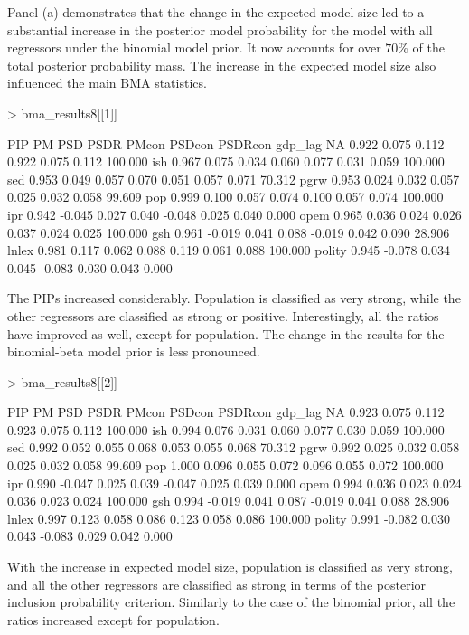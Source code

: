 \documentclass[a4paper]{article}
\begin{document}
Panel (a) demonstrates that the change in the expected model size led to a substantial increase in the posterior model probability for the model with all regressors under the binomial model prior.
It now accounts for over $70\%$ of the total posterior probability mass.
The increase in the expected model size also influenced the main BMA statistics.
\begin{Schunk}
\begin{Sinput}
> bma_results8[[1]]
\end{Sinput}
\begin{Soutput}
          PIP     PM   PSD  PSDR  PMcon PSDcon PSDRcon    %
gdp_lag    NA  0.922 0.075 0.112  0.922  0.075   0.112 100.000
ish     0.967  0.075 0.034 0.060  0.077  0.031   0.059 100.000
sed     0.953  0.049 0.057 0.070  0.051  0.057   0.071  70.312
pgrw    0.953  0.024 0.032 0.057  0.025  0.032   0.058  99.609
pop     0.999  0.100 0.057 0.074  0.100  0.057   0.074 100.000
ipr     0.942 -0.045 0.027 0.040 -0.048  0.025   0.040   0.000
opem    0.965  0.036 0.024 0.026  0.037  0.024   0.025 100.000
gsh     0.961 -0.019 0.041 0.088 -0.019  0.042   0.090  28.906
lnlex   0.981  0.117 0.062 0.088  0.119  0.061   0.088 100.000
polity  0.945 -0.078 0.034 0.045 -0.083  0.030   0.043   0.000
\end{Soutput}
\end{Schunk}
The PIPs increased considerably.
Population is classified as very strong, while the other regressors are classified as strong or positive.
Interestingly, all the ratios have improved as well, except for population.
The change in the results for the binomial-beta model prior is less pronounced.
\begin{Schunk}
\begin{Sinput}
> bma_results8[[2]]
\end{Sinput}
\begin{Soutput}
          PIP     PM   PSD  PSDR  PMcon PSDcon PSDRcon    %
gdp_lag    NA  0.923 0.075 0.112  0.923  0.075   0.112 100.000
ish     0.994  0.076 0.031 0.060  0.077  0.030   0.059 100.000
sed     0.992  0.052 0.055 0.068  0.053  0.055   0.068  70.312
pgrw    0.992  0.025 0.032 0.058  0.025  0.032   0.058  99.609
pop     1.000  0.096 0.055 0.072  0.096  0.055   0.072 100.000
ipr     0.990 -0.047 0.025 0.039 -0.047  0.025   0.039   0.000
opem    0.994  0.036 0.023 0.024  0.036  0.023   0.024 100.000
gsh     0.994 -0.019 0.041 0.087 -0.019  0.041   0.088  28.906
lnlex   0.997  0.123 0.058 0.086  0.123  0.058   0.086 100.000
polity  0.991 -0.082 0.030 0.043 -0.083  0.029   0.042   0.000
\end{Soutput}
\end{Schunk}
With the increase in expected model size, population is classified as very strong, and all the other regressors are classified as strong in terms of the posterior inclusion probability criterion.
Similarly to the case of the binomial prior, all the ratios increased except for population.
\end{document}
